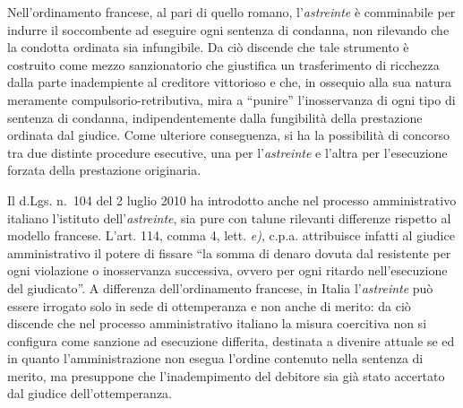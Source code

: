 \documentclass[12pt,it,a4paper,]{report}
\begin{document}
Nell'ordinamento francese, al pari di quello romano, l'\emph{astreinte}
è comminabile per indurre il soccombente ad eseguire ogni sentenza di
condanna, non rilevando che la condotta ordinata sia infungibile. Da ciò
discende che tale strumento è costruito come mezzo sanzionatorio che
giustifica un trasferimento di ricchezza dalla parte inadempiente al
creditore vittorioso e che, in ossequio alla sua natura meramente
compulsorio-retributiva, mira a ``punire'' l'inosservanza di ogni tipo
di sentenza di condanna, indipendentemente dalla fungibilità della
prestazione ordinata dal giudice. Come ulteriore conseguenza, si ha la
possibilità di concorso tra due distinte procedure esecutive, una per
l'\emph{astreinte} e l'altra per l'esecuzione forzata della prestazione
originaria.

Il d.Lgs. n.~104 del 2 luglio 2010 ha introdotto anche nel processo
amministrativo italiano l'istituto dell'\emph{astreinte}, sia pure con
talune rilevanti differenze rispetto al modello francese. L'art. 114,
comma 4, lett. \emph{e)}, c.p.a. attribuisce infatti al giudice
amministrativo il potere di fissare ``la somma di denaro dovuta dal
resistente per ogni violazione o inosservanza successiva, ovvero per
ogni ritardo nell'esecuzione del giudicato''. A differenza
dell'ordinamento francese, in Italia l'\emph{astreinte} può essere
irrogato solo in sede di ottemperanza e non anche di merito: da ciò
discende che nel processo amministrativo italiano la misura coercitiva
non si configura come sanzione ad esecuzione differita, destinata a
divenire attuale se ed in quanto l'amministrazione non esegua l'ordine
contenuto nella sentenza di merito, ma presuppone che l'inadempimento
del debitore sia già stato accertato dal giudice dell'ottemperanza.
\end{document}
